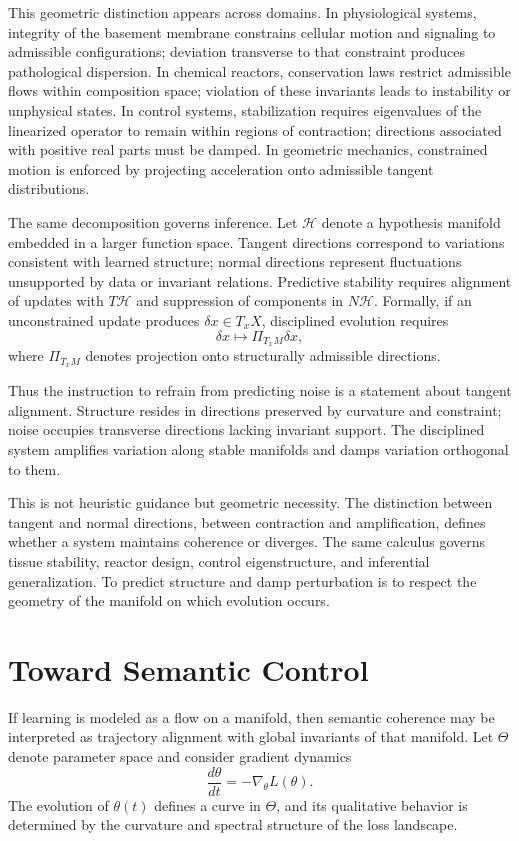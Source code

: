 \documentclass[12pt]{book}
\begin{document}
This geometric distinction appears across domains. In physiological systems, integrity of the basement membrane constrains cellular motion and signaling to admissible configurations; deviation transverse to that constraint produces pathological dispersion. In chemical reactors, conservation laws restrict admissible flows within composition space; violation of these invariants leads to instability or unphysical states. In control systems, stabilization requires eigenvalues of the linearized operator to remain within regions of contraction; directions associated with positive real parts must be damped. In geometric mechanics, constrained motion is enforced by projecting acceleration onto admissible tangent distributions.

The same decomposition governs inference. Let $\mathcal{H}$ denote a hypothesis manifold embedded in a larger function space. Tangent directions correspond to variations consistent with learned structure; normal directions represent fluctuations unsupported by data or invariant relations. Predictive stability requires alignment of updates with $T \mathcal{H}$ and suppression of components in $N \mathcal{H}$. Formally, if an unconstrained update produces $\delta x \in T_x X$, disciplined evolution requires
\[
\delta x \mapsto \Pi_{T_x M} \delta x,
\]
where $\Pi_{T_x M}$ denotes projection onto structurally admissible directions.

Thus the instruction to refrain from predicting noise is a statement about tangent alignment. Structure resides in directions preserved by curvature and constraint; noise occupies transverse directions lacking invariant support. The disciplined system amplifies variation along stable manifolds and damps variation orthogonal to them.

This is not heuristic guidance but geometric necessity. The distinction between tangent and normal directions, between contraction and amplification, defines whether a system maintains coherence or diverges. The same calculus governs tissue stability, reactor design, control eigenstructure, and inferential generalization. To predict structure and damp perturbation is to respect the geometry of the manifold on which evolution occurs.

\section{Toward Semantic Control}

If learning is modeled as a flow on a manifold, then semantic coherence may be interpreted as trajectory alignment with global invariants of that manifold. Let $\Theta$ denote parameter space and consider gradient dynamics
\[
\frac{d\theta}{dt} = - \nabla_\theta L(\theta).
\]
The evolution of $\theta(t)$ defines a curve in $\Theta$, and its qualitative behavior is determined by the curvature and spectral structure of the loss landscape.
\end{document}
